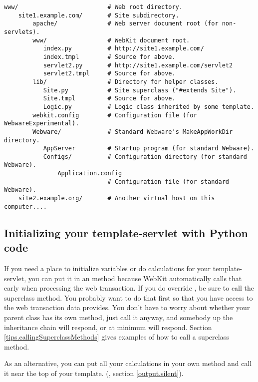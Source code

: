 \begin{verbatim}
www/                         # Web root directory.
    site1.example.com/       # Site subdirectory.
        apache/              # Web server document root (for non-servlets).
        www/                 # WebKit document root. 
           index.py          # http://site1.example.com/
           index.tmpl        # Source for above.
           servlet2.py       # http://site1.example.com/servlet2
           servlet2.tmpl     # Source for above.
        lib/                 # Directory for helper classes.
           Site.py           # Site superclass ("#extends Site").
           Site.tmpl         # Source for above.
           Logic.py          # Logic class inherited by some template.
        webkit.config        # Configuration file (for WebwareExperimental).
        Webware/             # Standard Webware's MakeAppWorkDir directory.
           AppServer         # Startup program (for standard Webware).
           Configs/          # Configuration directory (for standard Webware).
               Application.config
                             # Configuration file (for standard Webware). 
    site2.example.org/       # Another virtual host on this computer....
\end{verbatim}



\subsection{Initializing your template-servlet with Python code}
\label{webware.calculations}

If you need a place to initialize variables or do calculations for your
template-servlet, you can put it in an  method because WebKit
automatically calls that early when processing the web transaction.  If you
do override , be sure to call the superclass 
method.  You probably want to do that first so that you have access to the
web transaction data  provides.  You don't have to worry
about whether your parent class has its own  method, just call
it anyway, and somebody up the inheritance chain will respond, or at minimum
 will respond.  Section
\ref{tips.callingSuperclassMethods} gives examples of how to call a
superclass method.

As an alternative, you can put all your calculations in your own method and
call it near the top of your template.  (, section
\ref{output.silent}).

